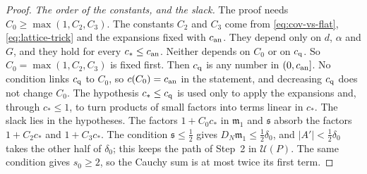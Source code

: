 \begin{proof}
\emph{The order of the constants, and the slack.} The proof needs $C_0\ge\max(1,C_2,C_3)$. The constants $C_2$ and $C_3$ come from \eqref{eq:cov-vs-flat}, \eqref{eq:lattice-trick} and the expansions fixed with $c_{\rm an}$. They depend only on $d$, $\alpha$ and $G$, and they hold for every $c_*\le c_{\rm an}$. Neither depends on $C_0$ or on $c_{\rm q}$. So $C_0=\max(1,C_2,C_3)$ is fixed first. Then $c_{\rm q}$ is any number in $(0,c_{\rm an}]$. No condition links $c_{\rm q}$ to $C_0$, so $c(C_0)=c_{\rm an}$ in the statement, and decreasing $c_{\rm q}$ does not change $C_0$. The hypothesis $c_*\le c_{\rm q}$ is used only to apply the expansions and, through $c_*\le1$, to turn products of small factors into terms linear in $c_*$. The slack lies in the hypotheses. The factors $1+C_0c_*$ in $\mathfrak m_1$ and $\mathfrak s$ absorb the factors $1+C_2c_*$ and $1+C_3c_*$. The condition $\mathfrak s\le\frac12$ gives $D_N\mathfrak m_1\le\frac12\delta_0$, and $|A'|<\frac12\delta_0$ takes the other half of $\delta_0$; this keeps the path of Step~2 in $\mathcal U(P)$. The same condition gives $s_0\ge2$, so the Cauchy sum is at most twice its first term.
\end{proof}

